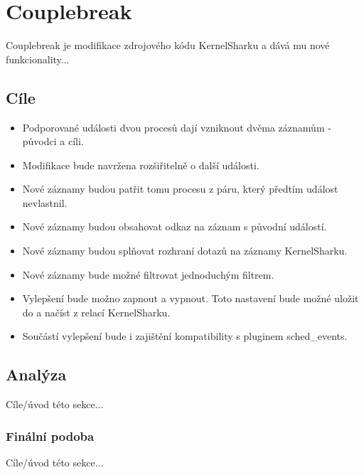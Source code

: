 \chapter{Couplebreak}
Couplebreak je modifikace zdrojového kódu KernelSharku a dává mu nové funkcionality...

\section{Cíle}

\begin{itemize}
    \item Podporované události dvou procesů dají vzniknout dvěma záznamům - původci a cíli.
    \item Modifikace bude navržena rozšiřitelně o další události.
    \item Nové záznamy budou patřit tomu procesu z páru, který předtím událost nevlastnil.
    \item Nové záznamy budou obsahovat odkaz na záznam s původní událostí.
    \item Nové záznamy budou splňovat rozhraní dotazů na záznamy KernelSharku.
    \item Nové záznamy bude možné filtrovat jednoduchým filtrem.
    \item Vylepšení bude možno zapnout a vypnout. Toto nastavení bude možné uložit do a načíst z relací KernelSharku.
    \item Součástí vylepšení bude i zajištění kompatibility s pluginem sched\_events.
\end{itemize}

\section{Analýza}
Cíle/úvod této sekce...


\subsection*{Finální podoba}
Cíle/úvod této sekce...

